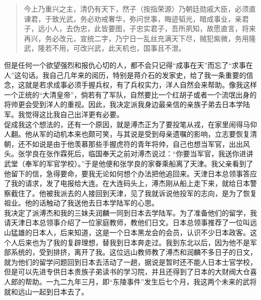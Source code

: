 \begin{quote}
	今上乃重兴之主，清仍有天下，然子（按指荣源）乃朝廷勋戚大臣，必须直谏君，于致光武，务必劝戒奢华，弥问世事，晦迹韬光，暗成事业，亲君子，远小人，去伪忠，此皆要图，子忠实君子，吾所夙知，故愿直言，将来再兴，务必改元，宣统二字，乃宁日一乱丝充满天下尽，贼犯紫微，务用隆武，隆若不用，可改兴武，此天机也，国事且不泄。\\
\end{quote}

但是任何一个欲望强烈和报仇心切的人，都不会只记得“成事在天”而忘了“求事在人”这句话。我自己几年来的阅历，特别是蒋介石的发家史，给了我一条重要的信念，这就是若求成事必须手握兵权，有了兵权实力，洋人自然会来帮助。像我这样一个正统的“大清皇帝”，倘若有了军队，自然要比一个红胡子或者一个流氓出身的将帅更会受到洋人的重视。因此，我决定派我身边最亲信的亲族子弟去日本学陆军。我觉得这比我自己出洋更有必要。\\

促成我这个想法的，还有一个原因，就是溥杰正为了要投笔从戎，在家里闹得马仰人翻。他从军的动机本来也颇可笑，与其说是受到母亲遗嘱的影响，立志要恢复清朝，还不如说是由于他羡慕那些手握虎符的青年将帅，自己也想当军官，出出风头。张学良在张作霖死后，临国奉天之前对溥杰说过：“你要当军官，我送你进讲武堂（奉军的军官学校）。”于是他便和张学良的家眷乘船离了天津。我父亲看到了他留下的信，急得要命，要我无论如何想个办法把他追回来。天津日本总领事答应了我的请求，发了电报给大连。在大连码头上，溥杰刚从船上走下来，就给日本警察截住了。他被我派去的人接回到天津，见了我就诉说他投军的志向，是为了恢复祖业。他的话触动了我送他去日本学陆军的心思。\\

我决定了派溥杰和我的三妹夫润麟一同到日本去学陆军。为了准备他们的留学，我请天津日本总领事介绍了一位家庭教师，教他们日文。日本总领事推荐了一位叫远山猛雄的日本人，后来知道，这是一个日本黑龙会的会员，认识不少日本政客。这个人后来也为了我的复辟理想，替我到日本奔走过。我到东北以后，因为他不是军部系统的，受到排挤，离开了我。这位远山教师教了溥杰和润麟不多日子的日文，就为他们的留学问题回到日本去活动了一趟，据说是暂时还不能人日本士官学校，但是可以先进专供日本贵族子弟读书的学习院，并且还得到了日本的大财阀大仓喜人郎的帮助。一九二九年三月，即“东陵事件”发生后七个月，我这两个未来的武将就和远山一起到日本去了。
